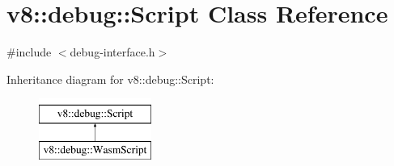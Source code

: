 \hypertarget{classv8_1_1debug_1_1Script}{}\section{v8\+:\+:debug\+:\+:Script Class Reference}
\label{classv8_1_1debug_1_1Script}


{\ttfamily \#include $<$debug-\/interface.\+h$>$}

Inheritance diagram for v8\+:\+:debug\+:\+:Script\+:\begin{figure}[H]
\begin{center}
\leavevmode
\includegraphics[height=2.000000cm]{classv8_1_1debug_1_1Script}
\end{center}
\end{figure}
